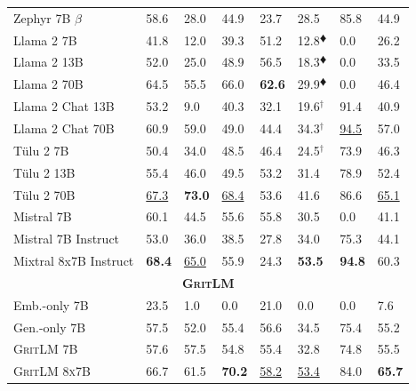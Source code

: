 \documentclass{article}
\newcommand{\model}{\textsc{GritLM}}
\newcommand{\tulu}{T\"ulu}
\newcommand{\llama}{Llama}
\begin{document}
\begin{table}[htbp]
{\begin{tabular}{l|llllll|l}
Zephyr 7B $\beta$ & 58.6 & 28.0 & 44.9 & 23.7 & 28.5 & 85.8 & 44.9 \\
\llama{} 2 7B & 41.8 & 12.0 & 39.3 & 51.2 & 12.8$^\vardiamond$ & 0.0 & 26.2 \\
\llama{} 2 13B & 52.0 & 25.0 & 48.9 & 56.5 & 18.3$^\vardiamond$ & 0.0 & 33.5 \\
\llama{} 2 70B & 64.5 & 55.5 & 66.0 & \textbf{62.6} & 29.9$^\vardiamond$ & 0.0 & 46.4 \\
\llama{} 2 Chat 13B & 53.2 & 9.0 & 40.3 & 32.1 & 19.6$^{\dagger}$ & 91.4 & 40.9 \\
\llama{} 2 Chat 70B & 60.9 & 59.0 & 49.0 & 44.4 & 34.3$^{\dagger}$ & \underline{94.5} & 57.0 \\
\tulu{} 2 7B & 50.4 & 34.0 & 48.5 & 46.4 & 24.5$^{\dagger}$ & 73.9 & 46.3 \\
\tulu{} 2 13B & 55.4 & 46.0 & 49.5 & 53.2 & 31.4 & 78.9 & 52.4 \\
\tulu{} 2 70B & \underline{67.3} & \textbf{73.0} & \underline{68.4} & 53.6 & 41.6 & 86.6 & \underline{65.1} \\
Mistral 7B & 60.1 & 44.5 & 55.6 & 55.8 & 30.5 & 0.0 & 41.1 \\
Mistral 7B Instruct & 53.0 & 36.0 & 38.5 & 27.8 & 34.0 & 75.3 & 44.1 \\
Mixtral 8x7B Instruct & \textbf{68.4} & \underline{65.0} & 55.9 & 24.3 & \textbf{53.5} & \textbf{94.8} & 60.3 \\
\midrule
\multicolumn{8}{c}{\textbf{\model{}}} \\
\midrule
Emb.-only 7B & 23.5 & 1.0 & 0.0 & 21.0 & 0.0 & 0.0 & 7.6 \\
Gen.-only 7B & 57.5 & 52.0 & 55.4 & 56.6 & 34.5 & 75.4 & 55.2 \\
\model{} \textsc{7B} & 57.6 & 57.5 & 54.8 & 55.4 & 32.8 & 74.8 & 55.5 \\
\model{} \textsc{8x7B} & 66.7 & 61.5 & \textbf{70.2} & \underline{58.2} & \underline{53.4} & 84.0 & \textbf{65.7}\\

\end{tabular}}
\end{table}
\end{document}

